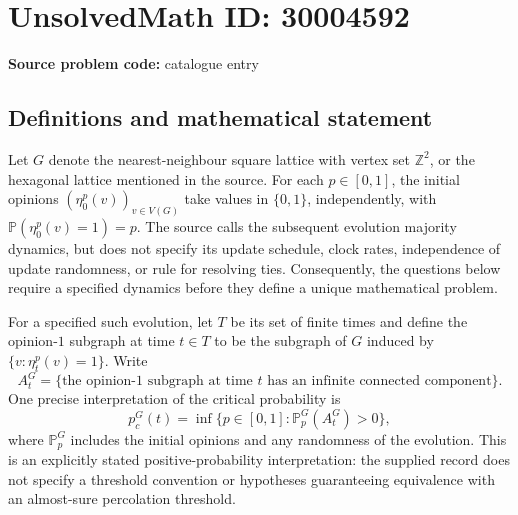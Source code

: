 \documentclass[11pt]{article}
\newcommand{\Z}{\mathbb{Z}}
\begin{document}
\section*{UnsolvedMath ID: 30004592}
\textbf{Source problem code:} catalogue entry
\subsection{Definitions and mathematical statement}
Let \(G\) denote the nearest-neighbour square lattice with vertex set \(\Z^2\), or the hexagonal lattice mentioned in the source. For each \(p\in[0,1]\), the initial opinions \((\eta_0^p(v))_{v\in V(G)}\) take values in \(\{0,1\}\), independently, with \(\mathbb P(\eta_0^p(v)=1)=p\). The source calls the subsequent evolution majority dynamics, but does not specify its update schedule, clock rates, independence of update randomness, or rule for resolving ties. Consequently, the questions below require a specified dynamics before they define a unique mathematical problem.

For a specified such evolution, let \(T\) be its set of finite times and define the opinion-\(1\) subgraph at time \(t\in T\) to be the subgraph of \(G\) induced by \(\{v:\eta_t^p(v)=1\}\). Write
\[
 A_t^G=\{\text{the opinion-\(1\) subgraph at time \(t\) has an infinite connected component}\}.
\]
One precise interpretation of the critical probability is
\[
 p_c^G(t)=\inf\bigl\{p\in[0,1]:\mathbb P_p^G(A_t^G)>0\bigr\},
\]
where \(\mathbb P_p^G\) includes the initial opinions and any randomness of the evolution. This is an explicitly stated positive-probability interpretation: the supplied record does not specify a threshold convention or hypotheses guaranteeing equivalence with an almost-sure percolation threshold.
\end{document}
